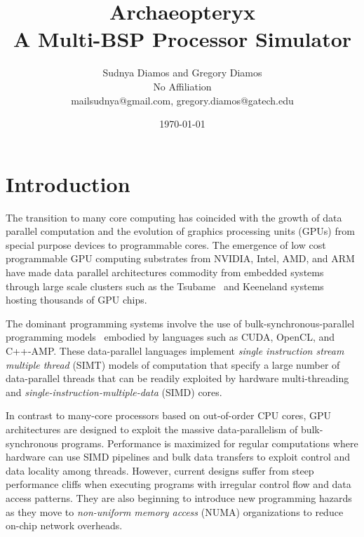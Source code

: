 \documentclass[conference, 10pt]{IEEEtran}
\begin{document}
 

\title{Archaeopteryx\\
A Multi-BSP Processor Simulator}

\author{Sudnya Diamos and Gregory Diamos  \\
No Affiliation \\
{\small mailsudnya@gmail.com, gregory.diamos@gatech.edu}}
\date{\today}

\maketitle

\section{Introduction}
\label{sec:introduction}

The transition to many core computing has coincided with the growth of
data parallel computation and the evolution of graphics processing
units (GPUs) from special purpose devices to programmable cores. 
The emergence of low cost programmable GPU computing substrates from
NVIDIA, Intel, AMD, and ARM have made data parallel architectures commodity
from embedded systems through large scale clusters such as the
Tsubame~\cite{ref:tsubame} and Keeneland systems~\cite{ref:keeneland}
hosting thousands of GPU chips.

The dominant programming systems involve the use of
bulk-synchronous-parallel programming models~\cite{ref:bulk-synchronous}
embodied by languages such as CUDA, OpenCL, and C++-AMP.  These data-parallel
languages implement \textit{single instruction stream multiple thread} (SIMT)
models of computation that specify a large number of
data-parallel threads that can be readily exploited by hardware
multi-threading and \textit{single-instruction-multiple-data} (SIMD)
cores. 

In contrast to many-core processors based on out-of-order CPU cores,
GPU architectures are designed to exploit the massive data-parallelism of
bulk-synchronous programs. Performance is maximized for regular computations
where hardware can use SIMD pipelines and bulk data transfers to exploit
control and data locality among threads.  However, current designs suffer
from steep performance cliffs when executing programs with irregular control
flow and data access patterns.  
They are also beginning to introduce new
programming hazards as they move to \textit{non-uniform memory access} (NUMA)
organizations to reduce on-chip network overheads.  
\end{document}
